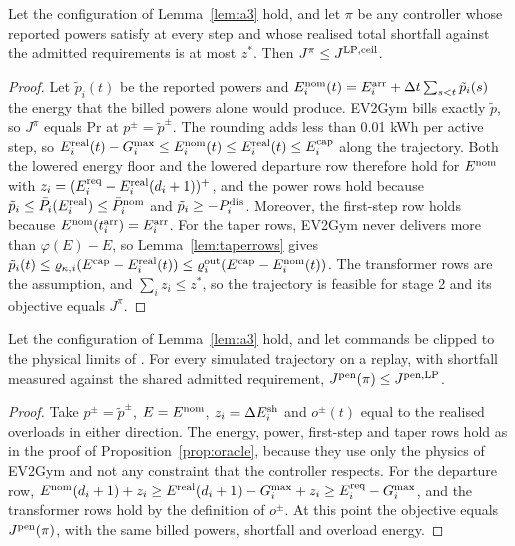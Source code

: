 \begin{proposition}\label{prop:oracle}
Let the configuration of Lemma~\ref{lem:a3} hold, and let $\pi$ be any controller whose reported powers satisfy  at every step and whose realised total shortfall against the admitted requirements is at most $z^{*}$.
Then $J^{\pi}\le J^{\mathrm{LP,ceil}}$.
\end{proposition}

\begin{proof}
Let $\tilde p_i(t)$ be the reported powers and $E_i^{\mathrm{nom}}(t)=E_i^{\mathrm{arr}}+\Delta t\sum_{s<t}\tilde p_i(s)$ the energy that the billed powers alone would produce.
EV2Gym bills exactly $\tilde p$, so $J^{\pi}$ equals $\mathrm{Pr}$ at $p^{\pm}=\tilde p^{\pm}$.
The rounding adds less than 0.01 kWh per active step, so $E_i^{\mathrm{real}}(t)-G_i^{\max}\le E_i^{\mathrm{nom}}(t)\le E_i^{\mathrm{real}}(t)\le E_i^{\mathrm{cap}}$ along the trajectory.
Both the lowered energy floor and the lowered departure row therefore hold for $E^{\mathrm{nom}}$ with $z_i=(E^{\mathrm{req}}_i-E_i^{\mathrm{real}}(d_i+1))^{+}$, and the power rows hold because $\tilde p_i\le\bar P_i(E_i^{\mathrm{real}})\le\bar P^{\mathrm{nom}}_i$ and $\tilde p_i\ge-P^{\mathrm{dis}}_i$.
Moreover, the first-step row holds because $E^{\mathrm{nom}}(t_i^{\mathrm{arr}})=E_i^{\mathrm{arr}}$.
For the taper rows, EV2Gym never delivers more than $\varphi(E)-E$, so Lemma~\ref{lem:taperrows} gives $\tilde p_i(t)\le\varrho_{\kappa,i}(E^{\mathrm{cap}}-E_i^{\mathrm{real}}(t))\le\varrho_i^{\mathrm{out}}(E^{\mathrm{cap}}-E_i^{\mathrm{nom}}(t))$.
The transformer rows are the assumption, and $\sum_iz_i\le z^{*}$, so the trajectory is feasible for stage 2 and its objective equals $J^{\pi}$.
\end{proof}

\begin{proposition}\label{prop:softoracle}
Let the configuration of Lemma~\ref{lem:a3} hold, and let commands be clipped to the physical limits of .
For every simulated trajectory on a replay, with shortfall measured against the shared admitted requirement, $J^{\mathrm{pen}}(\pi)\le J^{\mathrm{pen,LP}}$.
\end{proposition}

\begin{proof}
Take $p^{\pm}=\tilde p^{\pm}$, $E=E^{\mathrm{nom}}$, $z_i=\Delta E_i^{\mathrm{sh}}$ and $o^{\pm}(t)$ equal to the realised overloads in either direction.
The energy, power, first-step and taper rows hold as in the proof of Proposition~\ref{prop:oracle}, because they use only the physics of EV2Gym and not any constraint that the controller respects.
For the departure row, $E^{\mathrm{nom}}(d_i+1)+z_i\ge E^{\mathrm{real}}(d_i+1)-G_i^{\max}+z_i\ge E^{\mathrm{req}}_i-G_i^{\max}$, and the transformer rows hold by the definition of $o^{\pm}$.
At this point the objective equals $J^{\mathrm{pen}}(\pi)$, with the same billed powers, shortfall and overload energy.
\end{proof}

